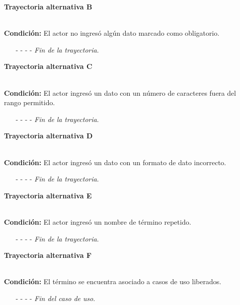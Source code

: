 	\hypertarget{CU6-2:TAB}{\textbf{Trayectoria alternativa B}}\\
	\noindent \textbf{Condición:} El actor no ingresó algún dato marcado como obligatorio.
	\begin{enumerate}
		\UCpaso[\UCsist] Muestra el mensaje  señalando el campo que presenta el error en la pantalla .
		\UCpaso Regresa al paso \ref{CU6.2-P5} de la trayectoria principal.
		\item[- -] - - {\em {Fin de la trayectoria}}.%
	\end{enumerate}
	\hypertarget{CU6-2:TAC}{\textbf{Trayectoria alternativa C}}\\
	\noindent \textbf{Condición:} El actor ingresó un dato con un número de caracteres fuera del rango permitido.
	\begin{enumerate}
		\UCpaso[\UCsist] Muestra el mensaje  señalando el campo que presenta el error en la pantalla .
		\UCpaso Regresa al paso \ref{CU6.2-P5} de la trayectoria principal.
		\item[- -] - - {\em {Fin de la trayectoria}}.%
	\end{enumerate}
	\hypertarget{CU6-2:TAD}{\textbf{Trayectoria alternativa D}}\\
	\noindent \textbf{Condición:} El actor ingresó un dato con un formato de dato incorrecto.
	\begin{enumerate}
		\UCpaso[\UCsist] Muestra el mensaje  señalando el campo que presenta el error en la pantalla .
		\UCpaso Regresa al paso \ref{CU6.2-P5} de la trayectoria principal.
		\item[- -] - - {\em {Fin de la trayectoria}}.
	\end{enumerate}
	\hypertarget{CU6-2:TAE}{\textbf{Trayectoria alternativa E}}\\
	\noindent \textbf{Condición:} El actor ingresó un nombre de término repetido.
	\begin{enumerate}
		\UCpaso[\UCsist] Muestra el mensaje  señalando el campo que presenta la duplicidad en la pantalla .
		\UCpaso Regresa al paso \ref{CU6.2-P5} de la trayectoria principal.
		\item[- -] - - {\em {Fin de la trayectoria}}.
	\end{enumerate}
\hypertarget{CU6-2:TAF}{\textbf{Trayectoria alternativa F}}\\
\noindent \textbf{Condición:} El término se encuentra asociado a casos de uso liberados.
\begin{enumerate}
	\UCpaso[\UCsist] Oculta el botón \editar del término que esta asociado a casos de uso liberados.
	\item[- -] - - {\em {Fin del caso de uso}}.
\end{enumerate}